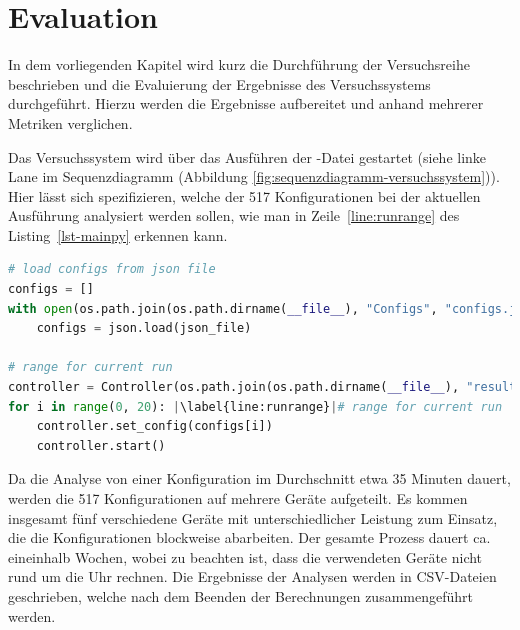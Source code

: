 \section{Evaluation} \label{sec:Evaluation}

In dem vorliegenden Kapitel wird kurz die Durchführung der Versuchsreihe beschrieben und die Evaluierung der Ergebnisse des Versuchssystems durchgeführt.
Hierzu werden die Ergebnisse aufbereitet und anhand mehrerer Metriken verglichen.

Das Versuchssystem wird über das Ausführen der -Datei gestartet (siehe linke Lane im Sequenzdiagramm (Abbildung \ref{fig:sequenzdiagramm-versuchssystem})).
Hier lässt sich spezifizieren, welche der 517 Konfigurationen bei der aktuellen Ausführung analysiert werden sollen, wie man in Zeile~\ref{line:runrange} des Listing~\ref{lst-mainpy} erkennen kann.

\begin{lstlisting}[language=Python,numbers=none,caption=Ausführen einer Versuchsreihe,label=lst-mainpy,escapechar=|]
# load configs from json file
configs = []
with open(os.path.join(os.path.dirname(__file__), "Configs", "configs.json"), "r") as json_file:
    configs = json.load(json_file)

# range for current run
controller = Controller(os.path.join(os.path.dirname(__file__), "results.csv"))
for i in range(0, 20): |\label{line:runrange}|# range for current run
    controller.set_config(configs[i])
    controller.start()
\end{lstlisting}

Da die Analyse von einer Konfiguration im Durchschnitt etwa 35 Minuten dauert, werden die 517 Konfigurationen auf mehrere Geräte aufgeteilt. 
Es kommen insgesamt fünf verschiedene Geräte mit unterschiedlicher Leistung zum Einsatz, die die Konfigurationen blockweise abarbeiten.
Der gesamte Prozess dauert ca. eineinhalb Wochen, wobei zu beachten ist, dass die verwendeten Geräte nicht rund um die Uhr rechnen.
Die Ergebnisse der Analysen werden in CSV-Dateien geschrieben, welche nach dem Beenden der Berechnungen zusammengeführt werden.

